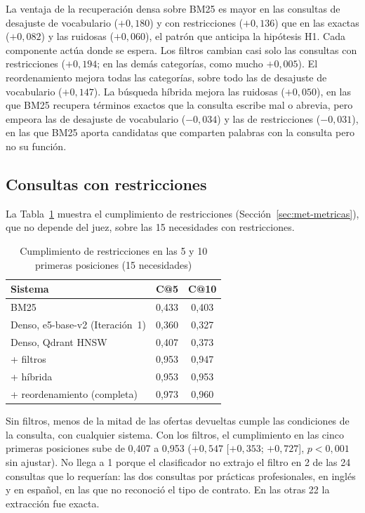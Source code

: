 La ventaja de la recuperación densa sobre BM25 es mayor en las consultas de desajuste de vocabulario ($+0{,}180$) y con restricciones ($+0{,}136$) que en las exactas ($+0{,}082$) y las ruidosas ($+0{,}060$), el patrón que anticipa la hipótesis H1. Cada componente actúa donde se espera. Los filtros cambian casi solo las consultas con restricciones ($+0{,}194$; en las demás categorías, como mucho $+0{,}005$). El reordenamiento mejora todas las categorías, sobre todo las de desajuste de vocabulario ($+0{,}147$). La búsqueda híbrida mejora las ruidosas ($+0{,}050$), en las que BM25 recupera términos exactos que la consulta escribe mal o abrevia, pero empeora las de desajuste de vocabulario ($-0{,}034$) y las de restricciones ($-0{,}031$), en las que BM25 aporta candidatas que comparten palabras con la consulta pero no su función.

\subsection{Consultas con restricciones}

La Tabla~\ref{tab:res-restricciones} muestra el cumplimiento de restricciones (Sección~\ref{sec:met-metricas}), que no depende del juez, sobre las 15 necesidades con restricciones.

\begin{table}[htbp!]
    \centering
    \caption{Cumplimiento de restricciones en las 5 y 10 primeras posiciones (15 necesidades)}
    \label{tab:res-restricciones}
    \begin{tabular}{|l|c|c|}
        \hline
        \textbf{Sistema} & \textbf{C@5} & \textbf{C@10} \\
        \hline
        BM25 & 0{,}433 & 0{,}403 \\
        \hline
        Denso, e5-base-v2 (Iteración~1) & 0{,}360 & 0{,}327 \\
        \hline
        Denso, Qdrant HNSW & 0{,}407 & 0{,}373 \\
        \hline
        + filtros & 0{,}953 & 0{,}947 \\
        \hline
        + híbrida & 0{,}953 & 0{,}953 \\
        \hline
        + reordenamiento (completa) & 0{,}973 & 0{,}960 \\
        \hline
    \end{tabular}
\end{table}

Sin filtros, menos de la mitad de las ofertas devueltas cumple las condiciones de la consulta, con cualquier sistema. Con los filtros, el cumplimiento en las cinco primeras posiciones sube de 0,407 a 0,953 ($+0{,}547$ [$+0{,}353$; $+0{,}727$], $p < 0{,}001$ sin ajustar). No llega a 1 porque el clasificador no extrajo el filtro en 2 de las 24 consultas que lo requerían: las dos consultas por prácticas profesionales, en inglés y en español, en las que no reconoció el tipo de contrato. En las otras 22 la extracción fue exacta.

